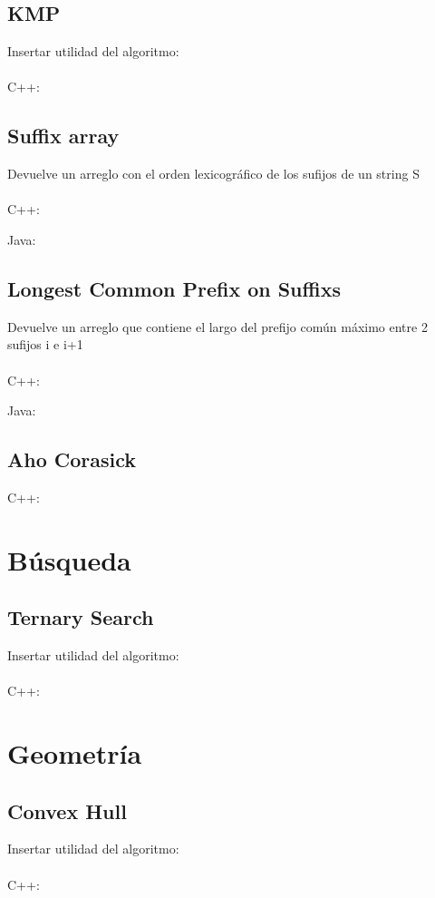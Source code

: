 \documentclass{article}
\begin{document}
    \subsection{KMP}
        Insertar utilidad del algoritmo:
        \\ \\
        C++:
        
    \subsection{Suffix array}
        Devuelve un arreglo con el orden lexicográfico de los sufijos de un string S
        \\ \\
        C++:
        
        Java:
        
    \subsection{Longest Common Prefix on Suffixs}
        Devuelve un arreglo que contiene el largo del prefijo común máximo entre 2 sufijos i e i+1
        \\ \\
        C++:
        
        Java:
        
    \subsection{Aho Corasick}
        C++:
        
\pagebreak
\section{Búsqueda}
    \subsection{Ternary Search}
        Insertar utilidad del algoritmo:
        \\ \\
        C++:
        
\pagebreak
\section{Geometría}
    \subsection{Convex Hull}
        Insertar utilidad del algoritmo:
        \\ \\
        C++:
        
\end{document}
